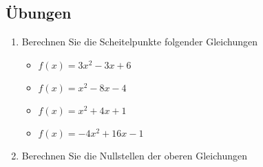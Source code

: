 \subsection{Übungen}
\begin{enumerate}
\item Berechnen Sie die Scheitelpunkte folgender Gleichungen
\begin{itemize}
\item $f(x) = 3x^2 - 3x + 6$
\item $f(x) = x^2 - 8x - 4$
\item $f(x) = x^2 + 4x + 1$
\item $f(x) = -4x^2 + 16x - 1$
\end{itemize}
\item Berechnen Sie die Nullstellen der oberen Gleichungen
\end{enumerate}